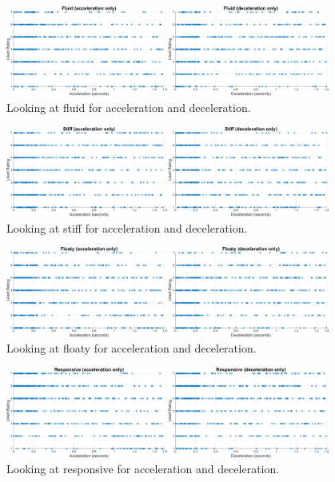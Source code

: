 \begin{figure}[htbp]
\centering
\includegraphics[width=0.95\textwidth]{Pics/Classes/fluid_both}
\caption{Looking at fluid for acceleration and deceleration.}
\label{fig:fluid_both}
\end{figure}

\begin{figure}[htbp]
\centering
\includegraphics[width=0.95\textwidth]{Pics/Classes/stiff_both}
\caption{Looking at stiff for acceleration and deceleration.}
\label{fig:stiff_both}
\end{figure}

\begin{figure}[htbp]
\centering
\includegraphics[width=0.95\textwidth]{Pics/Classes/floaty_both}
\caption{Looking at floaty for acceleration and deceleration.}
\label{fig:floaty_both}
\end{figure}

\begin{figure}[htbp]
\centering
\includegraphics[width=0.95\textwidth]{Pics/Classes/responsive_both}
\caption{Looking at responsive for acceleration and deceleration.}
\label{fig:responsive_both}
\end{figure}

